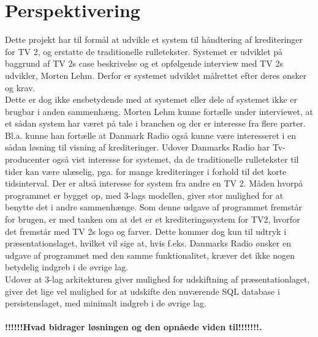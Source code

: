 \section{Perspektivering}

Dette projekt har til formål at udvikle et system til håndtering af krediteringer for TV 2, og erstatte de traditionelle rulletekster. Systemet er udviklet på baggrund af TV 2s case beskrivelse og et opfølgende interview med TV 2s udvikler, Morten Lehm. Derfor er systemet udviklet målrettet efter deres ønsker og krav. \\
Dette er dog ikke ensbetydende med at systemet eller dele af systemet ikke er brugbar i anden sammenhæng. Morten Lehm kunne fortælle under interviewet, at et sådan system har været på tale i branchen og der er interesse fra flere parter. Bl.a. kunne han fortælle at Danmark Radio også kunne være interesseret i en sådan løsning til visning af krediteringer. Udover Danmarks Radio har Tv-producenter også vist interesse for systemet, da de traditionelle rulletekster til tider kan være ulæselig, pga. for mange krediteringer i forhold til det korte tidsinterval. Der er altså interesse for system fra andre en TV 2. Måden hvorpå programmet er bygget op, med 3-lags modellen, giver stor mulighed for at benytte det i andre sammenhænge. Som denne udgave af programmet fremstår for brugen, er med tanken om at det er et krediteringssystem for TV2, hvorfor det fremstår med TV 2s logo og farver. Dette kommer dog kun til udtryk i præsentationslaget, hvilket vil sige at, hvis f.eks. Danmarks Radio ønsker en udgave af programmet med den samme funktionalitet, kræver det ikke nogen betydelig indgreb i de øvrige lag. \\
Udover at 3-lag arkitekturen giver mulighed for udskiftning af præsentationlaget, giver det lige vel mulighed for at udskifte den nuværende SQL database i persistenslaget, med minimalt indgreb i de øvrige lag. \\\\

\textbf{!!!!!!Hvad  bidrager  løsningen  og  den opnåede  viden  til!!!!!!!. }
\\
\\

